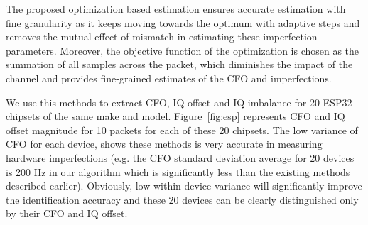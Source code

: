 
The proposed optimization based estimation ensures accurate estimation with fine granularity as it keeps moving towards the optimum with adaptive steps and removes the mutual effect of mismatch in estimating these imperfection parameters. Moreover, the objective function of the optimization is chosen as the summation of all samples across the packet, which diminishes the impact of the channel and provides fine-grained estimates of the CFO and \iq imperfections.

We use this methods to extract CFO, IQ offset and IQ imbalance for 20 ESP32 chipsets of the same make and model. Figure~\ref{fig:esp} represents CFO and IQ offset magnitude for 10 packets for each of these 20 chipsets. The low variance of CFO for each device, shows these methods is very accurate in measuring hardware imperfections (e.g. the CFO standard deviation average for 20 devices is 200 Hz in our algorithm which is significantly less than the existing methods described earlier). Obviously, low within-device variance will significantly improve the identification accuracy and these 20 devices can be clearly distinguished only by their CFO and IQ offset. 
\fi

